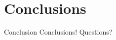 \documentclass[12pt]{beamer}
\begin{document}
\section{Conclusions}
\begin{frame}{Conclusion}
\vfill
Conclusions!
\vfill
Questions?
\vfill
\end{frame}
\end{document}
